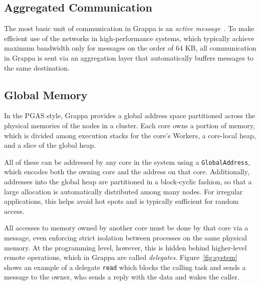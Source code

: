\subsection{Aggregated Communication}
The most basic unit of communication in Grappa is an \emph{active message}~\cite{vonEicken92}.
To make efficient use of the networks in high-performance systems, which typically achieve maximum bandwidth only for messages on the order of 64 KB, all communication in Grappa is sent via an aggregation layer that automatically buffers messages to the same destination.

\subsection{Global Memory}
In the PGAS style, Grappa provides a global address space partitioned across the physical memories of the nodes in a cluster. Each core owns a portion of memory, which is divided among execution stacks for the core's Workers, a core-local heap, and a slice of the global heap.

All of these can be addressed by any core in the system using a \texttt{GlobalAddress}, which encodes both the owning core and the address on that core. Additionally, addresses into the global heap are partitioned in a block-cyclic fashion, so that a large allocation is automatically distributed among many nodes. For irregular applications, this helps avoid hot spots and is typically sufficient for random access.

All accesses to memory owned by another core must be done by that core via a message, even enforcing strict isolation between processes on the same physical memory. At the programming level, however, this is hidden behind higher-level remote operations, which in Grappa are called \emph{delegates}. Figure~\ref{fig:system} shows an example of a delegate \texttt{read} which blocks the calling task and sends a message to the owner, who sends a reply with the data and wakes the caller.

